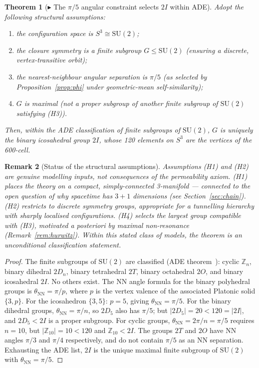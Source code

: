\documentclass[12pt]{article}
\newtheorem{theorem}{Theorem}
\newtheorem{remark}[theorem]{Remark}
\begin{document}
\begin{theorem}[$\blacktriangleright$ The $\pi/5$ angular constraint selects $2I$ within ADE]\label{thm:600cell}
Adopt the following structural assumptions:
\begin{enumerate}
    \item[(H1)] the configuration space is $S^3 \cong \mathrm{SU}(2)$;
    \item[(H2)] the closure symmetry is a finite subgroup $G \leq \mathrm{SU}(2)$ (ensuring a discrete, vertex-transitive orbit);
    \item[(H3)] the nearest-neighbour angular separation is $\pi/5$ (as selected by Proposition~\ref{prop:phi} under geometric-mean self-similarity);
    \item[(H4)] $G$ is maximal (not a proper subgroup of another finite subgroup of $\mathrm{SU}(2)$ satisfying (H3)).
\end{enumerate}
Then, within the ADE classification of finite subgroups of
$\mathrm{SU}(2)$, $G$ is uniquely the binary icosahedral group $2I$,
whose 120 elements on $S^3$ are the vertices of the 600-cell.
\end{theorem}

\begin{remark}[Status of the structural assumptions]
Assumptions (H1) and (H2) are genuine modelling inputs, not consequences
of the permeability axiom. (H1) places the theory on a compact,
simply-connected 3-manifold --- connected to the open question of why
spacetime has $3+1$ dimensions (see Section~\ref{sec:chain}). (H2)
restricts to discrete symmetry groups, appropriate for a tunnelling
hierarchy with sharply localised configurations. (H4) selects the
largest group compatible with (H3), motivated \textit{a posteriori} by
maximal non-resonance (Remark~\ref{rem:hurwitz}). Within this stated
class of models, the theorem is an unconditional classification
statement.
\end{remark}

\begin{proof}
The finite subgroups of $\mathrm{SU}(2)$ are classified (ADE
theorem~\citep{McKay1980,Klein1884}): cyclic $\mathbb{Z}_n$, binary
dihedral $2D_n$, binary tetrahedral $2T$, binary octahedral $2O$, and
binary icosahedral $2I$. No others exist. The NN angle formula for the
binary polyhedral groups is $\theta_{\mathrm{NN}} = \pi/p$, where $p$ is
the vertex valence of the associated Platonic solid $\{3,p\}$. For the
icosahedron $\{3,5\}$: $p = 5$, giving $\theta_{\mathrm{NN}} = \pi/5$.
For the binary dihedral groups, $\theta_{\mathrm{NN}} = \pi/n$, so
$2D_5$ also has $\pi/5$; but $|2D_5| = 20 < 120 = |2I|$, and
$2D_5 < 2I$ is a proper subgroup. For cyclic groups,
$\theta_{\mathrm{NN}} = 2\pi/n = \pi/5$ requires $n = 10$, but
$|\mathbb{Z}_{10}| = 10 < 120$ and $\mathbb{Z}_{10} < 2I$. The groups
$2T$ and $2O$ have NN angles $\pi/3$ and $\pi/4$ respectively, and do
not contain $\pi/5$ as an NN separation. Exhausting the ADE list, $2I$
is the unique maximal finite subgroup of $\mathrm{SU}(2)$ with
$\theta_{\mathrm{NN}} = \pi/5$.
\end{proof}
\end{document}
